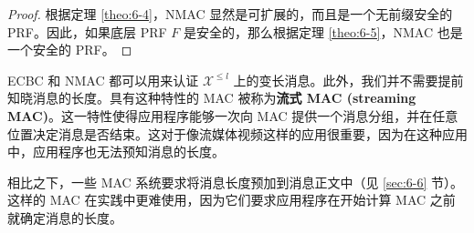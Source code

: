 \begin{proof}
根据定理 \ref{theo:6-4}，NMAC 显然是可扩展的，而且是一个无前缀安全的 PRF。因此，如果底层 PRF $F$ 是安全的，那么根据定理 \ref{theo:6-5}，NMAC 也是一个安全的 PRF。
\end{proof}

\begin{snote}
ECBC 和 NMAC 都可以用来认证 $\mathcal{X}^{\leq l}$ 上的变长消息。此外，我们并不需要提前知晓消息的长度。具有这种特性的 MAC 被称为\textbf{流式 MAC (streaming MAC)}。这一特性使得应用程序能够一次向 MAC 提供一个消息分组，并在任意位置决定消息是否结束。这对于像流媒体视频这样的应用很重要，因为在这种应用中，应用程序也无法预知消息的长度。

相比之下，一些 MAC 系统要求将消息长度预加到消息正文中（见 \ref{sec:6-6} 节）。这样的 MAC 在实践中更难使用，因为它们要求应用程序在开始计算 MAC 之前就确定消息的长度。
\end{snote}